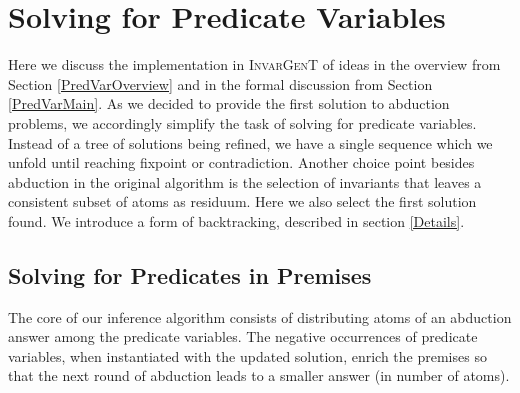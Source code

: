 \documentclass{article}
\newcommand{\tmname}[1]{\textsc{#1}}
\begin{document}
\section{Solving for Predicate Variables}\label{PredVarAlg}

Here we discuss the implementation in {\tmname{InvarGenT}} of ideas in the
overview from Section \ref{PredVarOverview} and in the formal discussion from
Section \ref{PredVarMain}. As we decided to provide the first solution to
abduction problems, we accordingly simplify the task of solving for predicate
variables. Instead of a tree of solutions being refined, we have a single
sequence which we unfold until reaching fixpoint or contradiction. Another
choice point besides abduction in the original algorithm is the selection of
invariants that leaves a consistent subset of atoms as residuum. Here we also
select the first solution found. We introduce a form of backtracking,
described in section \ref{Details}.

\subsection{Solving for Predicates in Premises}

The core of our inference algorithm consists of distributing atoms of an
abduction answer among the predicate variables. The negative occurrences of
predicate variables, when instantiated with the updated solution, enrich the
premises so that the next round of abduction leads to a smaller answer (in
number of atoms).
\end{document}
